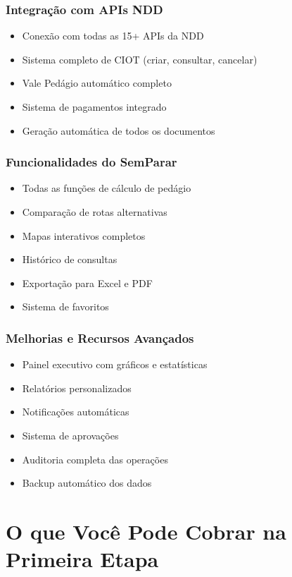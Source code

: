 \documentclass[12pt,a4paper]{article}
\begin{document}
\subsubsection{Integração com APIs NDD}
\begin{itemize}
    \item Conexão com todas as 15+ APIs da NDD
    \item Sistema completo de CIOT (criar, consultar, cancelar)
    \item Vale Pedágio automático completo
    \item Sistema de pagamentos integrado
    \item Geração automática de todos os documentos
\end{itemize}

\subsubsection{Funcionalidades do SemParar}
\begin{itemize}
    \item Todas as funções de cálculo de pedágio
    \item Comparação de rotas alternativas
    \item Mapas interativos completos
    \item Histórico de consultas
    \item Exportação para Excel e PDF
    \item Sistema de favoritos
\end{itemize}

\subsubsection{Melhorias e Recursos Avançados}
\begin{itemize}
    \item Painel executivo com gráficos e estatísticas
    \item Relatórios personalizados
    \item Notificações automáticas
    \item Sistema de aprovações
    \item Auditoria completa das operações
    \item Backup automático dos dados
\end{itemize}

\section{O que Você Pode Cobrar na Primeira Etapa}
\end{document}
